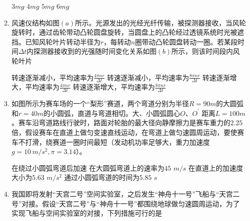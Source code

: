 \begin{enumerate}[leftmargin=0em]
\begin{minipage}[h!]{0.7\linewidth}
\vspace{0.3em}
\fourchoices
{$ 3mg $}
{$ 4mg $}
{$ 5mg $}
{$ 6mg $}
\vspace{0.3em}
\end{minipage}
\hfill
\begin{minipage}[h!]{0.3\linewidth}
\flushright
\vspace{0.3em}

\vspace{0.3em}
\end{minipage}



\item 
{}
风速仪结构如图$ (a) $所示。光源发出的光经光纤传输，被探测器接收，当风轮旋转时，通过齿轮带动凸轮圆盘旋转，当圆盘上的凸轮经过透镜系统时光被遮挡。已知风轮叶片转动半径为$ r $，每转动$ n $圈带动凸轮圆盘转动一圈。若某段时间$ \Delta t $内探测器接收到的光强随时间变化关系如图$ (b) $所示，则该时间段内风轮叶片  
\begin{figure}[h!]
\centering

\end{figure}


\fourchoices
{转速逐渐减小，平均速率为$\frac { 4 \pi n r } { \Delta t }$}
{转速逐渐减小，平均速率为$\frac { 8 \pi n r } { \Delta t }$}
{转速逐渐增大，平均速率为$\frac { 4 \pi n r } { \Delta t }$}
{转速逐渐增大，平均速率为$\frac { 8 \pi n r } { \Delta t }$}





\item 
{}
如图所示为赛车场的一个“梨形”赛道，两个弯道分别为半径$ R=90m $的大圆弧和$ r=40m $的小圆弧，直道与弯道相切。大、小圆弧圆心$ O $、$ O ^{\prime} $ 距离$ L=100m $。赛车沿弯道路线行驶时，路面对轮胎的最大径向静摩擦力是赛车重力的$ 2.25 $倍，假设赛车在直道上做匀变速直线运动，在弯道上做匀速圆周运动，要使赛车不打滑，绕赛道一圈时间最短（发动机功率足够大，重力加速度$ g=10 \ m/s^{2} ,\pi=3.14 $）。  
\begin{figure}[h!]
\centering

\end{figure}

\fourchoices
{在绕过小圆弧弯道后加速}
{在大圆弧弯道上的速率为$ 45 $ $ m/s $}
{在直道上的加速度大小为$ 5.63 $ $ m/s^{2} $}
{通过小圆弧弯道的时间为$ 5.85 $ $ s $}


\item 
{}
我国即将发射“天宫二号”空间实验室，之后发生“神舟十一号”飞船与“天宫二号”对接。假设“天宫二号”与“神舟十一号”都围绕地球做匀速圆周运动，为了实现飞船与空间实验室的对接，下列措施可行的是  



\end{enumerate}
